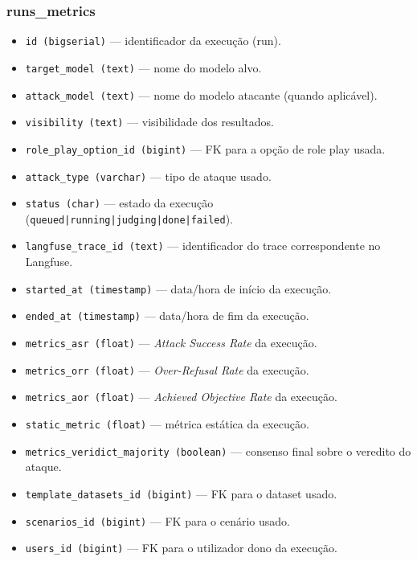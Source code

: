 \subsubsection{runs\_metrics}
\begin{itemize}
  \item \texttt{id (bigserial)} — identificador da execução (run).
  \item \texttt{target\_model (text)} — nome do modelo alvo.
  \item \texttt{attack\_model (text)} — nome do modelo atacante (quando aplicável).
  \item \texttt{visibility (text)} — visibilidade dos resultados.
  \item \texttt{role\_play\_option\_id (bigint)} — FK para a opção de role play usada.
  \item \texttt{attack\_type (varchar)} — tipo de ataque usado.
  \item \texttt{status (char)} — estado da execução (\texttt{queued|running|judging|done|failed}).
  \item \texttt{langfuse\_trace\_id (text)} — identificador do trace correspondente no Langfuse.
  \item \texttt{started\_at (timestamp)} — data/hora de início da execução.
  \item \texttt{ended\_at (timestamp)} — data/hora de fim da execução.
  \item \texttt{metrics\_asr (float)} — \textit{Attack Success Rate} da execução.
  \item \texttt{metrics\_orr (float)} — \textit{Over-Refusal Rate} da execução.
  \item \texttt{metrics\_aor (float)} — \textit{Achieved Objective Rate} da execução.
  \item \texttt{static\_metric (float)} — métrica estática da execução.
  \item \texttt{metrics\_veridict\_majority (boolean)} — consenso final sobre o veredito do ataque.
  \item \texttt{template\_datasets\_id (bigint)} — FK para o dataset usado.
  \item \texttt{scenarios\_id (bigint)} — FK para o cenário usado.
  \item \texttt{users\_id (bigint)} — FK para o utilizador dono da execução.
\end{itemize}

